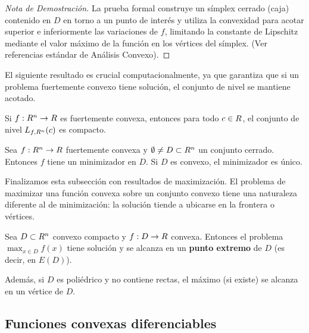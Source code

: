 \begin{proof}[Nota de Demostración]
 La prueba formal construye un símplex cerrado (caja) contenido en $D$ en torno a un punto de interés y utiliza la convexidad para acotar superior e inferiormente las variaciones de $f$, limitando la constante de Lipschitz mediante el valor máximo de la función en los vértices del símplex. (Ver referencias estándar de Análisis Convexo).
\end{proof}

El siguiente resultado es crucial computacionalmente, ya que garantiza que si un problema fuertemente convexo tiene solución, el conjunto de nivel se mantiene acotado.

\begin{theorem}\label{v1:thm:3.4.3}
 Si $f : R^n \to R$ es fuertemente convexa, entonces para todo $c \in R$, el conjunto de nivel $L_{f,R^n}(c)$ es compacto.
\end{theorem}

\begin{corollary}\label{v1:cor:3.4.1}
 Sea $f : R^n \to R$ fuertemente convexa y $\emptyset \neq D \subset R^n$ un conjunto cerrado. Entonces $f$ tiene un minimizador en $D$. Si $D$ es convexo, el minimizador es único.
\end{corollary}

Finalizamos esta subsección con resultados de maximización. El problema de maximizar una función convexa sobre un conjunto convexo tiene una naturaleza diferente al de minimización: la solución tiende a ubicarse en la frontera o vértices.

\begin{theorem}\label{v1:thm:3.4.4}
 Sea $D \subset R^n$ convexo compacto y $f : D \to R$ convexa. Entonces el problema $\max_{x \in D} f(x)$ tiene solución y se alcanza en un \textbf{punto extremo} de $D$ (es decir, en $E(D)$).
 
 Además, si $D$ es poliédrico y no contiene rectas, el máximo (si existe) se alcanza en un vértice de $D$.
\end{theorem}

\subsection{Funciones convexas diferenciables}

